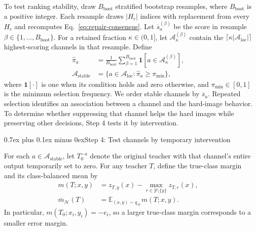 \documentclass[10pt,journal,compsoc]{IEEEtran}
\makeatletter
\def\subsection{\@startsection{subsection}{2}{\z@}{-3.5ex plus -0.5ex minus -1.5ex}%
{0.7ex plus 0.1ex minus 0ex}{\normalfont\normalsize\sffamily\bfseries}}
\theoremstyle{definition}
\makeatother
\begin{document}
To test ranking stability, draw $B_{\mathrm{boot}}$ stratified
bootstrap resamples, where $B_{\mathrm{boot}}$ is a positive
integer. Each resample draws $|H_c|$ indices with replacement
from every $H_c$ and recomputes Eq.~\eqref{eq:repair-consensus}.
Let $\overline{s}_a^{(\beta)}$ be the score in resample
$\beta\in\{1,\ldots,B_{\mathrm{boot}}\}$.
For a retained fraction $\kappa\in(0,1]$, let
$\mathcal A_{\kappa}^{(\beta)}$ contain the
$\lceil\kappa|\mathcal A_{\mathrm{loc}}|\rceil$
highest-scoring channels in that resample. Define
\begin{equation}
\label{eq:repair-stability}
\begin{aligned}
\widehat{\pi}_a
&=\frac{1}{B_{\mathrm{boot}}}
  \sum_{\beta=1}^{B_{\mathrm{boot}}}
  \mathbf{1}[a\in\mathcal A_{\kappa}^{(\beta)}],\\
\mathcal A_{\mathrm{stable}}
&=\{a\in\mathcal A_{\mathrm{loc}}:
                \widehat{\pi}_a\geq\pi_{\min}\},
\end{aligned}
\end{equation}
where $\mathbf{1}[\cdot]$ is one when its condition holds
and zero otherwise, and $\pi_{\min}\in[0,1]$ is the minimum
selection frequency. We order stable channels by
$\overline{s}_a$. Repeated selection identifies an association
between a channel and the hard-image behavior. To determine
whether suppressing that channel helps the hard images while
preserving other decisions, Step 4 tests it by intervention.

\vspace{-5pt}
\subsection{Step 4: Test channels by temporary intervention}

For each $a\in\mathcal A_{\mathrm{stable}}$, let $T_0^{-a}$
denote the original teacher with that channel's entire
output temporarily set to zero. For any teacher $T$, define
the true-class margin and its class-balanced mean by
\begin{equation}
\label{eq:repair-true-margin}
\begin{aligned}
m(T;x,y)&=z_{T,y}(x)-
 \max_{r\in\mathcal Y\setminus\{y\}}z_{T,r}(x),\\
\overline m_{\mathcal H}(T)
&=\mathbb E_{(x,y)\sim q_{\mathcal H}}m(T;x,y).
\end{aligned}
\end{equation}
In particular, $m(T_0;x_i,y_i)=-e_i$, so a larger true-class
margin corresponds to a smaller error margin.
\end{document}
